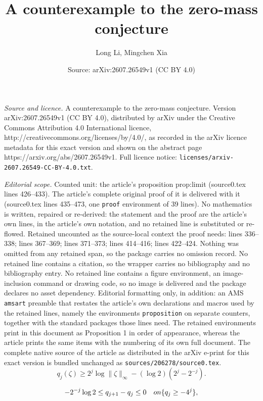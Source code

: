 \documentclass[10pt,a4paper]{amsart}
\title{A counterexample to the zero-mass conjecture}
\author{Long Li, Mingchen Xia}
\date{Source: arXiv:2607.26549v1 (CC BY 4.0)}
\begin{document}
\maketitle

\noindent\emph{Source and licence.} A counterexample to the zero-mass conjecture. Version arXiv:2607.26549v1 (CC BY 4.0), distributed by arXiv under the Creative Commons Attribution 4.0 International licence, http://creativecommons.org/licenses/by/4.0/, as recorded in the arXiv licence metadata for this exact version and shown on the abstract page https://arxiv.org/abs/2607.26549v1. Full licence notice: \texttt{licenses/arxiv-2607.26549-CC-BY-4.0.txt}.\par\smallskip

\noindent\textit{Editorial scope.} Counted unit: the article's proposition prop:limit (source0.tex lines 426--433). The article's complete original proof of it is delivered with it (source0.tex lines 435--473, one \texttt{proof} environment of 39 lines). No mathematics is written, repaired or re-derived: the statement and the proof are the article's own lines, in the article's own notation, and no retained line is substituted or re-flowed.  Retained uncounted as the source-local context the proof needs: lines 336--338; lines 367--369; lines 371--373; lines 414--416; lines 422--424.  Nothing was omitted from any retained span, so the package carries no omission record.  No retained line contains a citation, so the wrapper carries no bibliography and no bibliography entry.  No retained line contains a figure environment, an image-inclusion command or drawing code, so no image is delivered and the package declares no asset dependency.  Editorial formatting only, in addition: an AMS \texttt{amsart} preamble that restates the article's own declarations and macros used by the retained lines, namely the environments \texttt{proposition} on separate counters, together with the standard packages those lines need.  The retained environments print in this document as Proposition 1 in order of appearance, whereas the article prints the same items with the numbering of its own full document.  The complete native source of the article as distributed in the arXiv e-print for this exact version is bundled unchanged as \texttt{sources/206278/source0.tex}.
\begin{equation}\label{eq:q-lower}
  q_j(\zeta)\ge 2^j\log\|\zeta\|_\infty-(\log 2)(2^j-2^{-j}).
\end{equation}

\begin{equation}\label{eq:q-visible}
  -2^{-j}\log 2 \le q_{j+1}-q_j \le 0 \quad\textup{on }\{q_j\ge-4^j\},
\end{equation}
\end{document}
